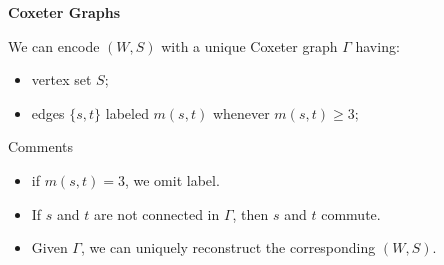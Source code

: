 \documentclass[9pt,handout]{beamer}
\begin{document}

\begin{frame}{\textbf{Coxeter Graphs}}

\begin{definition}
We can encode $(W,S)$ with a unique \alert{Coxeter graph} $\Gamma$ having: 

\begin{itemize}
\item vertex set $S$;

\item edges $\{s,t\}$ labeled $m(s,t)$ whenever $m(s,t)\geq 3;$



\end{itemize}

\vspace{-1em}

\end{definition}

\pause

\begin{block}{Comments}
\begin{itemize}

\item if $m(s,t)=3$, we omit label.

\item If $s$ and $t$ are not connected in $\Gamma$, then $s$ and $t$ 
commute.

\item Given $\Gamma$, we can uniquely reconstruct the corresponding $(W,S)
$. 

\end{itemize}

\end{block}

\end{frame}

\end{document}

